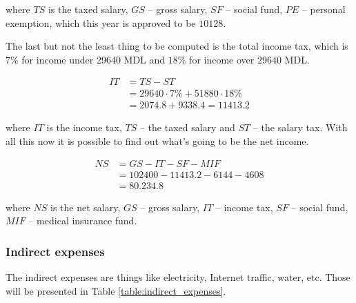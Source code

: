 \noindent
where $TS$ is the taxed salary, $GS$ -- gross salary, $SF$ -- social fund, $PE$ -- personal exemption, which this year is approved to be $10128$.

The last but not the least thing to be computed is the total income tax, which is $7\%$ for income under 29640 MDL and $18\%$ for income over 29640 MDL.

\begin{equation}
\begin{split}
 IT &= TS - ST \\
      &= 29640 \cdot 7\% + 51880 \cdot 18\% \\
      & = 2074.8 + 9338.4 = 11413.2
 \end{split}
\end{equation}

\noindent
where $IT$ is the income tax, $TS$ -- the taxed salary and $ST$ -- the salary tax. With all this now it is possible to find out what's going to be the net income.

\begin{equation}
\begin{split}
 NS &= GS - IT - SF - MIF \\
            &= 102400 - 11413.2 - 6144 - 4608 \\
            &= 80.234.8
\end{split}
\end{equation}

\noindent
where $NS$ is the net salary, $GS$ -- gross salary, $IT$ -- income tax, $SF$ -- social fund, $MIF$ -- medical insurance fund.

\subsubsection{Indirect expenses}
The indirect expenses are things like electricity, Internet traffic, water, etc. Those will be presented in Table \ref{table:indirect_expenses}.

